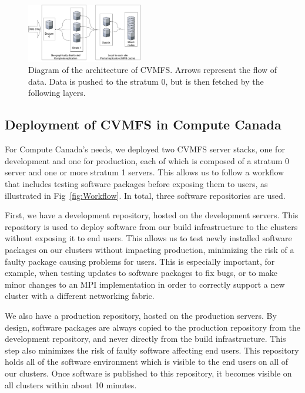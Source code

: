 \documentclass[sigconf]{acmart}
\begin{document}
\begin{figure}
  \includegraphics[width=0.45\textwidth]{CVMFS-structure.pdf}
  \caption{Diagram of the architecture of CVMFS. Arrows represent the flow of data. Data is pushed to the stratum 0, but is then fetched by the following layers.}
  \label{fig:CVMFS_structure}
\end{figure}

\subsection{Deployment of CVMFS in Compute Canada}
\label{sub:CVMFS_in_CC}
For Compute Canada's needs, we deployed two CVMFS server stacks, one for development and one for production, each of which is composed of a stratum 0 server and one or more stratum 1 servers. This allows us to follow a workflow that includes testing software packages before exposing them to users, as illustrated in Fig~\ref{fig:Workflow}. In total, three software repositories are used.

First, we have a development repository, hosted on the development servers. This repository is used to deploy software from our build infrastructure to the clusters without exposing it to end users. This allows us to test newly installed software packages on our clusters without impacting production, minimizing the risk of a faulty package causing problems for users. This is especially important, for example, when testing updates to software packages to fix bugs, or to make minor changes to an MPI implementation in order to correctly support a new cluster with a different networking fabric. 

We also have a production repository, hosted on the production servers. By design, software packages are always copied to the production repository from the development repository, and never directly from the build infrastructure. This step also minimizes the risk of faulty software affecting end users. This repository holds all of the software environment which is visible to the end users on all of our clusters. Once software is published to this repository, it becomes visible on all clusters within about 10 minutes. 
\end{document}
